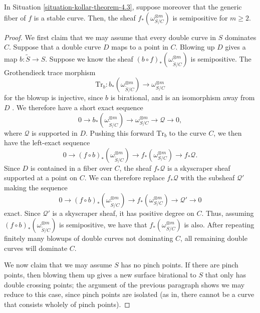 \begin{theorem}[cf.\ {\cite[Theorem 4.3]{Ko90}}]
\label{theorem-kollar-theorem-4.3}
In Situation \ref{situation-kollar-theorem-4.3}, suppose moreover that the
generic fiber of $f$ is a stable curve. Then,
the sheaf $f_*(\omega_{S/C}^{\otimes m})$ is semipositive for $m \ge 2$.
\end{theorem}
\begin{proof}
We first claim that we may assume that every double curve in $S$ dominates $C$.
Suppose that a double curve $D$ maps to a point in $C$.
Blowing up $D$ gives a map $b :
\widetilde{S} \to S$.
Suppose we know the sheaf $(b \circ f)_*(\omega_{\widetilde{S}/C}^{\otimes m})$
is semipositive.
The Grothendieck trace morphism
$$
\mathrm{Tr}_b : b_*(\omega_{\widetilde{S}/C}^{\otimes m})
\longrightarrow \omega_{S/C}^{\otimes m}
$$
for the blowup is injective, since $b$ is birational, and is an isomorphism away
from $D$ \cite[Prop.\ 5.77]{KM}.
We therefore have a short exact sequence
$$
0 \longrightarrow b_*(\omega_{\widetilde{S}/C}^{\otimes m})
\longrightarrow \omega_{S/C}^{\otimes m} \longrightarrow \mathcal{Q}
\longrightarrow 0,
$$
where $\mathcal{Q}$ is supported in $D$.
Pushing this forward $\mathrm{Tr}_b$ to the curve $C$, we then have the
left-exact sequence
$$
0 \longrightarrow (f \circ b)_*(\omega_{\widetilde{S}/C}^{\otimes m})
\longrightarrow f_*(\omega_{S/C}^{\otimes m}) \longrightarrow f_*\mathcal{Q}.
$$
Since $D$ is contained in a fiber over $C$, the sheaf $f_*\mathcal{Q}$ is a
skyscraper sheaf supported at a point on $C$.
We can therefore replace $f_*\mathcal{Q}$ with the subsheaf $\mathcal{Q}'$
making the sequence
$$
0 \longrightarrow (f \circ b)_*(\omega_{\widetilde{S}/C}^{\otimes m})
\longrightarrow f_*(\omega_{S/C}^{\otimes m}) \longrightarrow \mathcal{Q}'
\longrightarrow 0
$$
exact.
Since $\mathcal{Q}'$ is a skyscraper sheaf, it has positive degree on $C$.
Thus, assuming $(f \circ b)_*(\omega_{\widetilde{S}/C}^{\otimes m})$ is
semipositive, we have that $f_*(\omega_{S/C}^{\otimes m})$ is also.
After repeating finitely many blowups of double curves not dominating $C$,
all remaining double curves will dominate $C$.

We now claim that we may assume $S$ has no pinch points. If there are pinch
points, then blowing them up gives a new surface birational to $S$ that only has
double crossing points; the argument of the previous paragraph shows we may
reduce to this case, since pinch points are isolated (as in, there cannot be a
curve that consists wholely of pinch points).


\end{proof}
